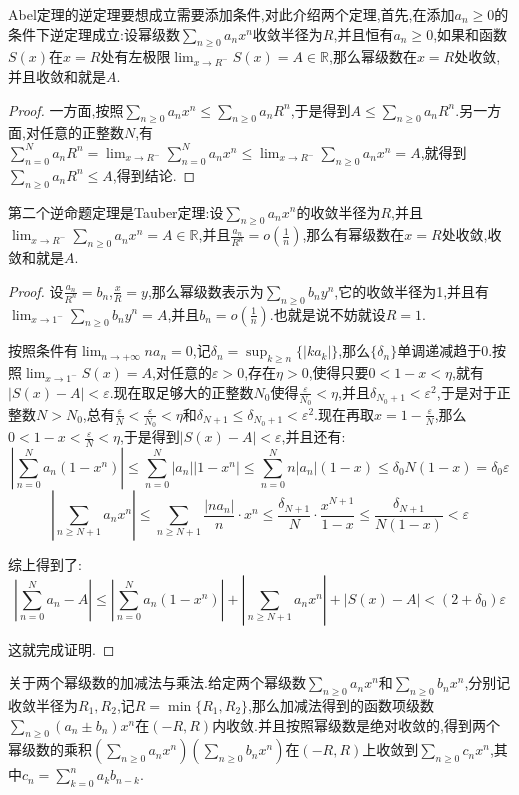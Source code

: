 Abel定理的逆定理要想成立需要添加条件,对此介绍两个定理,首先,在添加$a_n\ge0$的条件下逆定理成立:设幂级数$\sum_{n\ge0}a_nx^n$收敛半径为$R$,并且恒有$a_n\ge0$,如果和函数$S(x)$在$x=R$处有左极限$\lim_{x\to R^-}S(x)=A\in\mathbb{R}$,那么幂级数在$x=R$处收敛,并且收敛和就是$A$.
\begin{proof}
	
	一方面,按照$\sum_{n\ge0}a_nx^n\le\sum_{n\ge0}a_nR^n$,于是得到$A\le\sum_{n\ge0}a_nR^n$.另一方面,对任意的正整数$N$,有$\sum_{n=0}^Na_nR^n=\lim_{x\to R^-}\sum_{n=0}^Na_nx^n\le\lim_{x\to R^-}\sum_{n\ge0}a_nx^n=A$,就得到$\sum_{n\ge0}a_nR^n\le A$,得到结论.
	
\end{proof}

第二个逆命题定理是Tauber定理:设$\sum_{n\ge0}a_nx^n$的收敛半径为$R$,并且$\lim_{x\to R^-}\sum_{n\ge0}a_nx^n=A\in\mathbb{R}$,并且$\frac{a_n}{R^n}=o(\frac{1}{n})$,那么有幂级数在$x=R$处收敛,收敛和就是$A$.
\begin{proof}
	
	设$\frac{a_n}{R^n}=b_n$,$\frac{x}{R}=y$,那么幂级数表示为$\sum_{n\ge0}b_ny^n$,它的收敛半径为1,并且有$\lim_{x\to1^-}\sum_{n\ge0}b_ny^n=A$,并且$b_n=o(\frac{1}{n})$.也就是说不妨就设$R=1$.
	
	按照条件有$\lim_{n\to+\infty}na_n=0$,记$\delta_n=\sup_{k\ge n}\{|ka_k|\}$,那么$\{\delta_n\}$单调递减趋于0.按照$\lim_{x\to1^-}S(x)=A$,对任意的$\varepsilon>0$,存在$\eta>0$,使得只要$0<1-x<\eta$,就有$\left|S(x)-A\right|<\varepsilon$.现在取足够大的正整数$N_0$使得$\frac{\varepsilon}{N_0}<\eta$,并且$\delta_{N_0+1}<\varepsilon^2$,于是对于正整数$N>N_0$,总有$\frac{\varepsilon}{N}<\frac{\varepsilon}{N_0}<\eta$和$\delta_{N+1}\le\delta_{N_0+1}<\varepsilon^2$.现在再取$x=1-\frac{\varepsilon}{N}$,那么$0<1-x<\frac{\varepsilon}{N}<\eta$,于是得到$\left|S(x)-A\right|<\varepsilon$,并且还有:
	$$\left|\sum_{n=0}^Na_n(1-x^n)\right|\le\sum_{n=0}^{N}|a_n||1-x^n|\le\sum_{n=0}^{N}n|a_n|(1-x)\le\delta_0N(1-x)=\delta_0\varepsilon$$
	$$\left|\sum_{n\ge N+1}a_nx^n\right|\le\sum_{n\ge N+1}\frac{|na_n|}{n}\cdot x^n\le\frac{\delta_{N+1}}{N}\cdot\frac{x^{N+1}}{1-x}\le\frac{\delta_{N+1}}{N(1-x)}<\varepsilon$$
	
	综上得到了:
	$$\left|\sum_{n=0}^{N}a_n-A\right| \le\left|\sum_{n=0}^Na_n(1-x^n)\right|+\left|\sum_{n\ge N+1}a_nx^n\right|+\left|S(x)-A\right|<(2+\delta_0)\varepsilon$$
	
	这就完成证明.
	
\end{proof}

关于两个幂级数的加减法与乘法.给定两个幂级数$\sum_{n\ge0}a_nx^n$和$\sum_{n\ge0}b_nx^n$,分别记收敛半径为$R_1,R_2$,记$R=\min\{R_1,R_2\}$,那么加减法得到的函数项级数$\sum_{n\ge0}\left(a_n\pm b_n\right)x^n$在$(-R,R)$内收敛.并且按照幂级数是绝对收敛的,得到两个幂级数的乘积$\left(\sum_{n\ge0}a_nx^n\right)(\sum_ {n\ge0}b_nx^n)$在$(-R,R)$上收敛到$\sum_{n\ge0}c_nx^n$,其中$c_n=\sum_{k=0}^{n}a_kb_{n-k}$.

